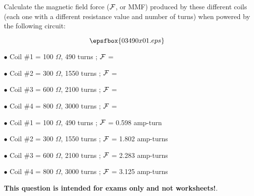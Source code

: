 

Calculate the magnetic field force ($\cal F$, or MMF) produced by these different coils (each one with a different resistance value and number of turns) when powered by the following circuit: 

$$\epsfbox{03490x01.eps}$$

\medskip
\item{$\bullet$} Coil \#1 = 100 $\Omega$, 490 turns ; $\cal F$ = 
\vskip 5pt
\item{$\bullet$} Coil \#2 = 300 $\Omega$, 1550 turns ; $\cal F$ = 
\vskip 5pt
\item{$\bullet$} Coil \#3 = 600 $\Omega$, 2100 turns ; $\cal F$ = 
\vskip 5pt
\item{$\bullet$} Coil \#4 = 800 $\Omega$, 3000 turns ; $\cal F$ = 
\medskip







\medskip
\item{$\bullet$} Coil \#1 = 100 $\Omega$, 490 turns ; $\cal F$ = 0.598 amp-turn
\vskip 5pt
\item{$\bullet$} Coil \#2 = 300 $\Omega$, 1550 turns ; $\cal F$ = 1.802 amp-turns
\vskip 5pt
\item{$\bullet$} Coil \#3 = 600 $\Omega$, 2100 turns ; $\cal F$ = 2.283 amp-turns
\vskip 5pt
\item{$\bullet$} Coil \#4 = 800 $\Omega$, 3000 turns ; $\cal F$ = 3.125 amp-turns
\medskip







{\bf This question is intended for exams only and not worksheets!}.



